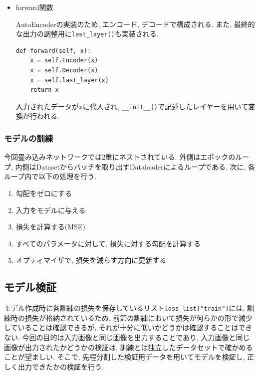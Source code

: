 \documentclass[dvipdfmx]{jsarticle}
\begin{document}
\begin{itemize}
\begin{figure}[H]
      \caption{出力前の調整の基本構造}\label{adjustment}
    \end{figure}    

    \item forward関数

    AutoEncoderの実装のため, エンコード, デコードで構成される.
    また, 最終的な出力の調整用に\verb|last_layer()|も実装される.

    
    \begin{lstlisting}
def forward(self, x):
    x = self.Encoder(x)
    x = self.Decoder(x)
    x = self.last_layer(x)           
    return x
    \end{lstlisting}

    入力されたデータが$x$に代入され, \verb|__init__()|で記述したレイヤーを用いて変換が行われる.

\end{itemize}

\subsubsection{モデルの訓練}
今回畳み込みネットワークでは2重にネストされている.
外側はエポックのループ, 内側はDatasetからバッチを取り出すDataloaderによるループである.
次に, 各ループ内で以下の処理を行う.

\begin{enumerate}
    \item 勾配をゼロにする

    \item 入力をモデルに与える

    \item 損失を計算する(MSE)

    \item すべてのパラメータに対して, 損失に対する勾配を計算する

    \item オプティマイザで, 損失を減らす方向に更新する 
    
\end{enumerate}

\subsection{モデル検証}
モデル作成時に各訓練の損失を保存しているリスト\verb+loss_list["train"]+には, 訓練時の損失が格納されているため, 前節の訓練において損失が何らかの形で減少していることは確認できるが, それが十分に低いかどうかは確認することはできない.
今回の目的は入力画像と同じ画像を出力することであり, 入力画像と同じ画像が出力されたかどうかの検証は, 訓練とは独立したデータセットで確かめることが望ましい.
そこで, 先程分割した検証用データを用いてモデルを検証し, 正しく出力できたかの検証を行う.
\end{document}
